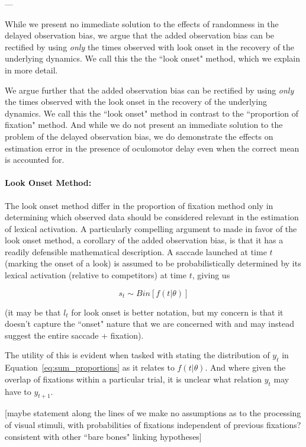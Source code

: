 ---

While we present no immediate solution to the effects of randomness in the delayed observation bias, we argue that the added observation bias can be rectified by using \textit{only} the times observed with look onset in the recovery of the underlying dynamics. We call this the the ``look onset" method, which we explain in more detail.

We argue further that the added observation bias can be rectified by using \textit{only} the times observed with the look onset in the recovery of the underlying dynamics. We call this the ``look onset" method in contrast to the ``proportion of fixation" method. And while we do not present an immediate solution to the problem of the delayed observation bias, we do demonstrate the effects on estimation error in the presence of oculomotor delay even when the correct mean is accounted for.


\paragraph{Look Onset Method:} The look onset method differ in the proportion of fixation method only in determining which observed data should be considered relevant in the estimation of lexical activation. A particularly compelling argument to made in favor of the look onset method, a corollary of the added observation bias, is that it has a readily defensible mathematical description. A saccade launched at time $t$ (marking the onset of a look) is assumed to be probabilistically determined by its lexical activation (relative to competitors) at time $t$, giving us

\begin{equation} \label{eq:saccade_dist}
s_t \sim Bin[f(t| \theta)]
\end{equation}

(it may be that $l_t$ for look onset is better notation, but my concern is that it doesn't capture the ``onset" nature that we are concerned with and may instead suggest the entire saccade + fixation).

The utility of this is evident when tasked with stating the distribution of $y_t$ in Equation~\ref{eq:sum_proportions} as it relates to $f(t|\theta)$. And where given the overlap of fixations within a particular trial, it is unclear what relation $y_t$ may have to $y_{t+1}$. 

[maybe statement along the lines of we make no assumptions as to the processing of visual stimuli, with probabilities of fixations independent of previous fixations? consistent with other ``bare bones" linking hypotheses]

